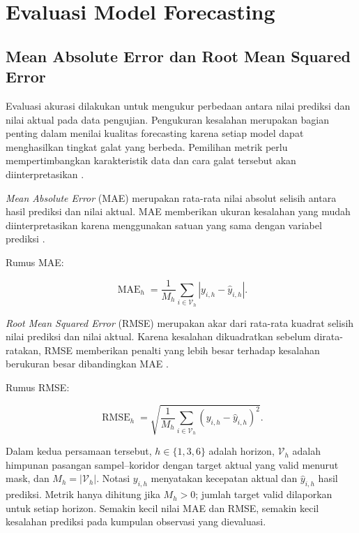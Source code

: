\section{Evaluasi Model Forecasting}
\label{sec:evaluasi_model}

\subsection{Mean Absolute Error dan Root Mean Squared Error}
\label{subsec:mae}
\label{subsec:rmse}

Evaluasi akurasi dilakukan untuk mengukur perbedaan antara nilai prediksi dan nilai aktual pada data pengujian. Pengukuran kesalahan merupakan bagian penting dalam menilai kualitas forecasting karena setiap model dapat menghasilkan tingkat galat yang berbeda. Pemilihan metrik perlu mempertimbangkan karakteristik data dan cara galat tersebut akan diinterpretasikan \cite{hyndman2006accuracy}.

\textit{Mean Absolute Error} (MAE) merupakan rata-rata nilai absolut selisih antara hasil prediksi dan nilai aktual. MAE memberikan ukuran kesalahan yang mudah diinterpretasikan karena menggunakan satuan yang sama dengan variabel prediksi \cite{hyndman2006accuracy}.

Rumus MAE:

\begin{equation}
 \operatorname{MAE}_h=\frac{1}{M_h}\sum_{i\in\mathcal{V}_h}|y_{i,h}-\hat{y}_{i,h}|.
 \label{eq:mae}
\end{equation}

\textit{Root Mean Squared Error} (RMSE) merupakan akar dari rata-rata kuadrat selisih nilai prediksi dan nilai aktual. Karena kesalahan dikuadratkan sebelum dirata-ratakan, RMSE memberikan penalti yang lebih besar terhadap kesalahan berukuran besar dibandingkan MAE \cite{hyndman2006accuracy}.

Rumus RMSE:

\begin{equation}
 \operatorname{RMSE}_h=\sqrt{\frac{1}{M_h}\sum_{i\in\mathcal{V}_h}(y_{i,h}-\hat{y}_{i,h})^2}.
 \label{eq:rmse}
\end{equation}

Dalam kedua persamaan tersebut, $h\in\{1,3,6\}$ adalah horizon, $\mathcal{V}_h$ adalah himpunan pasangan sampel--koridor dengan target aktual yang valid menurut mask, dan $M_h=|\mathcal{V}_h|$. Notasi $y_{i,h}$ menyatakan kecepatan aktual dan $\hat{y}_{i,h}$ hasil prediksi. Metrik hanya dihitung jika $M_h>0$; jumlah target valid dilaporkan untuk setiap horizon. Semakin kecil nilai MAE dan RMSE, semakin kecil kesalahan prediksi pada kumpulan observasi yang dievaluasi.

